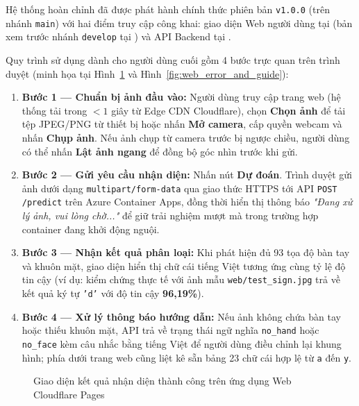 Hệ thống hoàn chỉnh đã được phát hành chính thức phiên bản \texttt{v1.0.0} (trên nhánh \texttt{main}) với hai điểm truy cập công khai: giao diện Web người dùng tại  (bản xem trước nhánh \texttt{develop} tại ) và API Backend tại .

Quy trình sử dụng dành cho người dùng cuối gồm 4 bước trực quan trên trình duyệt (minh họa tại Hình~\ref{fig:web_predict_success} và Hình~\ref{fig:web_error_and_guide}):
\begin{enumerate}
    \item \textbf{Bước 1 — Chuẩn bị ảnh đầu vào:} Người dùng truy cập trang web (hệ thống tải trong $< 1$ giây từ Edge CDN Cloudflare), chọn \textbf{Chọn ảnh} để tải tệp JPEG/PNG từ thiết bị hoặc nhấn \textbf{Mở camera}, cấp quyền webcam và nhấn \textbf{Chụp ảnh}. Nếu ảnh chụp từ camera trước bị ngược chiều, người dùng có thể nhấn \textbf{Lật ảnh ngang} để đồng bộ góc nhìn trước khi gửi.
    \item \textbf{Bước 2 — Gửi yêu cầu nhận diện:} Nhấn nút \textbf{Dự đoán}. Trình duyệt gửi ảnh dưới dạng \texttt{multipart/form-data} qua giao thức HTTPS tới API \texttt{POST /predict} trên Azure Container Apps, đồng thời hiển thị thông báo \textit{"Đang xử lý ảnh, vui lòng chờ..."} để giữ trải nghiệm mượt mà trong trường hợp container đang khởi động nguội.
    \item \textbf{Bước 3 — Nhận kết quả phân loại:} Khi phát hiện đủ 93 tọa độ bàn tay và khuôn mặt, giao diện hiển thị chữ cái tiếng Việt tương ứng cùng tỷ lệ độ tin cậy (ví dụ: kiểm chứng thực tế với ảnh mẫu \texttt{web/test\_sign.jpg} trả về kết quả ký tự \texttt{'d'} với độ tin cậy \textbf{96,19\%}).
    \item \textbf{Bước 4 — Xử lý thông báo hướng dẫn:} Nếu ảnh không chứa bàn tay hoặc thiếu khuôn mặt, API trả về trạng thái ngữ nghĩa \texttt{no\_hand} hoặc \texttt{no\_face} kèm câu nhắc bằng tiếng Việt để người dùng điều chỉnh lại khung hình; phía dưới trang web cũng liệt kê sẵn bảng 23 chữ cái hợp lệ từ \texttt{a} đến \texttt{y}.
\end{enumerate}

\begin{figure}[H]
\centering
{}
\caption{Giao diện kết quả nhận diện thành công trên ứng dụng Web Cloudflare Pages}
\label{fig:web_predict_success}
\end{figure}

